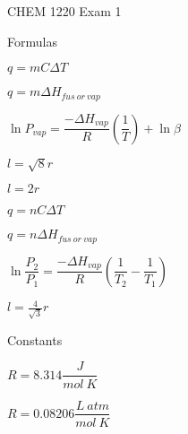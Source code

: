 \documentclass[12pt, letterpaper]{memoir}
\begin{document}
	\pagestyle{empty}
  {\Huge CHEM 1220 Exam 1}

  \vspace{4em}
	{\large Formulas}
	
	\begin{minipage}{0.5\linewidth}
		$q=mC\Delta T$
		
		$q=m\Delta H_{fus~or~vap}$
		
		 $\ln P_{vap} = \dfrac{-\Delta H_{vap}}{R}\left(\dfrac{1}{T}\right) + \ln\beta$	 
		
     $l=\sqrt{8}r$
		
     $l=2r$
	\end{minipage}
	\begin{minipage}{0.5\linewidth}
		$q=nC\Delta T$
		
		$q=n\Delta H_{fus~or~vap}$
		
		$\ln\dfrac{P_2}{P_1}=\dfrac{-\Delta H_{vap}}{R}\left(\dfrac{1}{T_2} - \dfrac{1}{T_1}\right)$	
		
    $l=\frac{4}{\sqrt{3}}r$	
	\end{minipage}
	
	\vspace{2em}

	{\large Constants}
	
	$R=8.314 \dfrac{J}{mol~K}$
	
	$R=0.08206 \dfrac{L~atm}{mol~K}$
\end{document}
